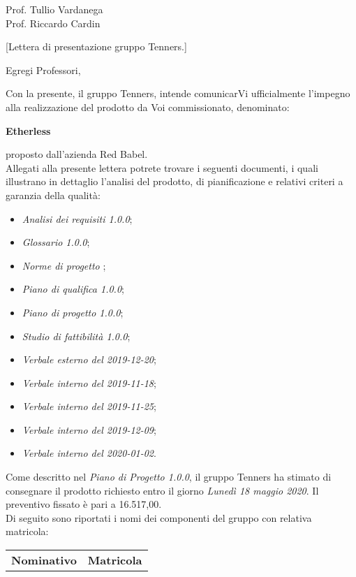 \begin{letter}{\begin{flushright}
			Prof. Tullio Vardanega \\
			Prof. Riccardo Cardin 
	\end{flushright}}[Lettera di presentazione gruppo Tenners.]
\opening[Padova, ]{Egregi Professori,}
	\noindent Con la presente, il gruppo Tenners, intende comunicarVi ufficialmente l'impegno alla realizzazione del prodotto da Voi commissionato, denominato:
	\begin{center}
		\textbf{Etherless}
	\end{center}
    proposto dall'azienda Red Babel. \\
    \noindent Allegati alla presente lettera potrete trovare i seguenti documenti, i quali illustrano in dettaglio l'analisi del prodotto, di pianificazione e relativi criteri a garanzia della qualità:
    \begin{itemize}
    	\item \textit{Analisi dei requisiti 1.0.0};
    	\item \textit{Glossario 1.0.0};
    	\item \textit{Norme di progetto };%
    	\item \textit{Piano di qualifica 1.0.0};
    	\item \textit{Piano di progetto 1.0.0};
    	\item \textit{Studio di fattibilità 1.0.0};
    	\item \textit{Verbale esterno del 2019-12-20};
    	\item \textit{Verbale interno del 2019-11-18};
    	\item \textit{Verbale interno del 2019-11-25};
    	\item \textit{Verbale interno del 2019-12-09};
    	\item \textit{Verbale interno del 2020-01-02}.
    \end{itemize}
    Come descritto nel \textit{Piano di Progetto 1.0.0}\docs, il gruppo Tenners ha stimato di consegnare il prodotto richiesto entro il giorno \textit{Lunedì 18 maggio 2020}. Il preventivo fissato è pari a 16.517,00\officialeuro.\\ 
    \noindent Di seguito sono riportati i nomi dei componenti del gruppo con relativa matricola:
    \begin{center}
        \begin{tabular}{c c}
        	\rowcolor{header}
    	    \textbf{Nominativo} & \textbf{Matricola} \\

\end{tabular}
\end{center}
\end{letter}
